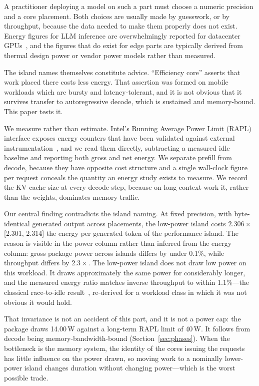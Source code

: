 \documentclass[journal]{IEEEtran}
\begin{document}
A practitioner deploying a model on such a part must choose a numeric precision
and a core placement. Both choices are usually made by guesswork, or by
throughput, because the data needed to make them properly does not exist.
Energy figures for LLM inference are overwhelmingly reported for datacenter
GPUs~\cite{samsi2023words,luccioni2024power}, and the figures that do exist for
edge parts are typically derived from thermal design power or vendor power
models rather than measured.

The island names themselves constitute advice. ``Efficiency core'' asserts that
work placed there costs less energy. That assertion was formed on mobile
workloads which are bursty and latency-tolerant, and it is not obvious that it
survives transfer to autoregressive decode, which is sustained and
memory-bound. This paper tests it.

We measure rather than estimate. Intel's Running Average Power Limit (RAPL)
interface exposes energy counters that have been validated against external
instrumentation~\cite{khan2018rapl}, and we read them directly, subtracting a
measured idle baseline and reporting both gross and net energy. We separate
prefill from decode, because they have opposite cost structure and a single
wall-clock figure per request conceals the quantity an energy study exists to
measure. We record the KV cache size at every decode step, because on
long-context work it, rather than the weights, dominates memory traffic.

Our central finding contradicts the island naming. At fixed precision, with
byte-identical generated output across placements, the low-power island costs
$2.306\times$ [2.301, 2.314] the energy per generated token of the
performance island.
The reason is visible in the power column rather than inferred from the energy
column: gross package power across islands differs by under 0.1\%, while
throughput differs by $2.3\times$. The low-power island does not draw low
power on this workload. It draws approximately the same power for considerably
longer, and the measured energy ratio matches inverse throughput to
within 1.1\%---the classical race-to-idle
result~\cite{lesueur2011slowdown,albers2014race}, re-derived for a workload
class in which it was not obvious it would hold.

That invariance is not an accident of this part, and it is not a power cap:
the package draws 14.00\,W against a long-term RAPL limit of 40\,W.
It follows from decode being memory-bandwidth-bound
(Section~\ref{sec:phases}). When the bottleneck is the memory system, the
identity of the cores issuing the requests has little influence on the power
drawn, so moving work to a nominally lower-power island changes duration
without changing power---which is the worst possible trade.
\end{document}
